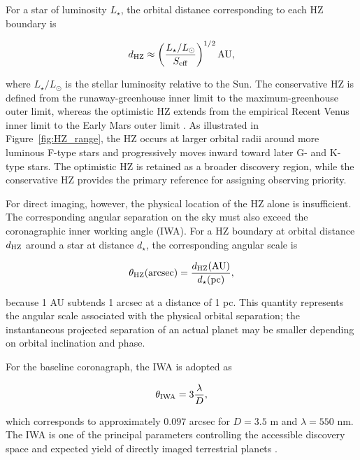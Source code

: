 For a star of luminosity $L_\star$, the orbital distance corresponding to each
HZ boundary is

\begin{equation}
d_{\rm HZ}
\approx
\left(
\frac{L_\star/L_\odot}{S_{\rm eff}}
\right)^{1/2}
{\rm AU},
\label{eq:hz-distance}
\end{equation}

\noindent
where $L_\star/L_\odot$ is the stellar luminosity relative to the Sun. The
conservative HZ is defined from the runaway-greenhouse inner limit to the
maximum-greenhouse outer limit, whereas the optimistic HZ extends from the
empirical Recent Venus inner limit to the Early Mars outer limit
\cite{Kopparapu13,kopparapu14}. As illustrated in
Figure~\ref{fig:HZ_range}, the HZ occurs at larger orbital radii around more
luminous F-type stars and progressively moves inward toward later G- and K-type
stars. The optimistic HZ is retained as a broader discovery region, while the
conservative HZ provides the primary reference for assigning observing priority.

For direct imaging, however, the physical location of the HZ alone is insufficient.
The corresponding angular separation on the sky must also exceed the coronagraphic
inner working angle (IWA). For a HZ boundary at orbital distance $d_{\rm HZ}$
around a star at distance $d_\star$, the corresponding angular scale is

\begin{equation}
\theta_{\rm HZ}({\rm arcsec})
=
\frac{d_{\rm HZ}({\rm AU})}{d_\star({\rm pc})},
\label{eq:hz-angular}
\end{equation}

\noindent
because 1 AU subtends 1 arcsec at a distance of 1 pc. This quantity represents
the angular scale associated with the physical orbital separation; the
instantaneous projected separation of an actual planet may be smaller depending
on orbital inclination and phase.

For the baseline coronagraph, the IWA is adopted as

\begin{equation}
\theta_{\rm IWA}
=
3\frac{\lambda}{D},
\label{eq:IWA}
\end{equation}

\noindent
which corresponds to approximately $0.097$ arcsec for $D=3.5$ m and
$\lambda=550$ nm. The IWA is one of the principal parameters controlling the
accessible discovery space and expected yield of directly imaged terrestrial
planets \cite{Stark2014}.

